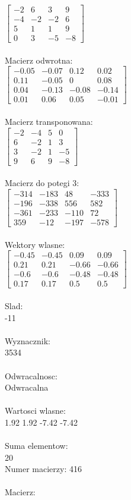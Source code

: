 \documentclass[a4paper,12pt]{article}
\begin{document}
$\begin{bmatrix} -2&6&3&9\\-4&-2&-2&6\\5&1&1&9\\0&3&-5&-8 \end{bmatrix}$
\\
\\
Macierz odwrotna:\\

$\begin{bmatrix} -0.05&-0.07&0.12&0.02\\0.11&-0.05&0&0.08\\0.04&-0.13&-0.08&-0.14\\0.01&0.06&0.05&-0.01 \end{bmatrix}$
\\
\\
Macierz transponowana:\\

$\begin{bmatrix} -2&-4&5&0\\6&-2&1&3\\3&-2&1&-5\\9&6&9&-8 \end{bmatrix}$
\\
\\
Macierz do potegi 3:\\

$\begin{bmatrix} -314&-183&48&-333\\-196&-338&556&582\\-361&-233&-110&72\\359&-12&-197&-578 \end{bmatrix}$
\\
\\
Wektory wlasne:\\

$\begin{bmatrix} -0.45&-0.45&0.09&0.09\\0.21&0.21&-0.66&-0.66\\-0.6&-0.6&-0.48&-0.48\\0.17&0.17&0.5&0.5 \end{bmatrix}$
\\
\\
Slad:\\
-11
\\
\\
Wyznacznik:\\
3534
\\
\\
Odwracalnosc:\\
Odwracalna
\\
\\
Wartosci wlasne:\\
1.92 1.92 -7.42 -7.42
\\
\\
Suma elementow:\\
20
\\
\newpage
Numer macierzy:
416
\\
\\
Macierz:\\
\end{document}
